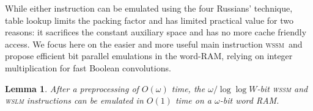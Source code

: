 \documentclass[12pt]{article}
\newtheorem{lemma}[theorem]{Lemma}
\newcommand{\comment}[1]{}
\newcommand{\W}{{\omega}}
\newcommand{\C}{{\alpha}}
\newcommand{\wssm}{\textsc{wssm}}
\newcommand{\wslm}{\textsc{wslm}}
\begin{document}




While either instruction can be emulated using the four
Russians' technique, table lookup limits the packing factor and
has limited practical value for two reasons:
it sacrifices the constant auxiliary space
and has no more cache friendly access.  
We focus here on the easier and more useful main instruction \wssm\ 
and propose efficient bit parallel emulations in the word-RAM, relying on integer
multiplication for fast Boolean convolutions. %

\begin{lemma}
  \label{lemma:instruction_simulation}
  After a preprocessing of $O(\W)$ time, the $\W/\log\log W$-bit {\rm \wssm} and
  {\rm \wslm} instructions can be emulated in $O(1)$ time
  on a $\W$-bit word RAM.
\end{lemma}


\comment{In Section~\ref{sec:hardware}, we perform a practical study on current
hardware platforms to show that the \wssm\ has low latency (2 machine
cycles). It can be therefore employed in practice as a basic block for
building efficient packed string matching software tools.}
\end{document}
